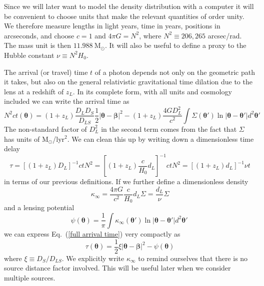 \documentclass[onecolumn,galley]{mn2e}
\newcommand{\Msun}{\ensuremath{\mathrm{M}_\odot}}
\newcommand{\eqnref}[1] {Eq.~(\ref{#1})}
\renewcommand{\vec}[1]{\ensuremath{\boldsymbol{#1}}}
\begin{document}
Since we will later want to model the density distribution with a computer it will
be convenient to choose units that make the relevant quantities of order unity.
We therefore measure lengths in light years, time in years, positions in
arcseconds, and choose $c=1$ and $4\pi G = N^2$, where $N^2 \equiv 206,265$
arcsec/rad. The mass unit is then $11.988\ \Msun$. It will also be useful to 
define a proxy to the Hubble constant $\nu \equiv N^2 H_0$.

The arrival (or travel) time $t$ of a photon depends not only on the geometric
path it takes, but also on the general relativistic gravitational time dilation
due to the lens at a redshift of $z_L$.  In its complete form, with all units
and cosmology included we can write the arrival time as
%
\begin{equation}
N^2ct(\vec\theta) = (1+z_L)\frac{D_{L}D_{S}}{D_{LS}}\frac12 |\vec\theta - \vec\beta|^2 - (1+z_L)\frac{4GD_{L}^2}{c^2}\int \Sigma(\vec\theta') \ln |\vec\theta-\vec\theta'| d^2\vec\theta'
\label{full arrival time}
\end{equation}
%
The non-standard factor of $D_L^2$ in the second term comes from the fact that $\Sigma$
has units of \Msun/lyr$^2$. We can clean this up by writing down a dimensionless time
delay 
%
\begin{equation}
\tau = \left[(1+z_L)D_{L}\right]^{-1}ctN^2 = \left[ (1+z_L) \frac{c}{H_0}d_L\right]^{-1}ctN^2 = \left[ (1+z_L) d_L\right]^{-1}\nu t
\label{tau}
\end{equation}
%
in terms of our previous definitions. If we
further define a dimensionless density
%
\begin{equation}
\kappa_\infty = \frac{4\pi G}{c^2}\frac{c}{H_0}d_L\Sigma
              = \frac{d_L}{\nu}\Sigma
\end{equation}
%
and a lensing potential
%
\begin{equation}
\psi(\vec\theta) = \frac1\pi \int \kappa_\infty(\vec\theta') \ln|\vec\theta - \vec\theta'| d^2\vec\theta'\
\label{lensing potential}
\end{equation}
%
we can express \eqnref{full arrival time} very compactly as
%
\begin{equation}
\tau(\vec\theta) = \frac12 \xi |\vec\theta-\vec\beta|^2 - \psi(\vec\theta)
\label{arrival time}
\end{equation}
%
where $\xi \equiv D_{S}/D_{LS}$. We explicitly write $\kappa_\infty$ to remind ourselves
that there is no source distance factor involved. This will be useful later when we consider
multiple sources.
\end{document}
